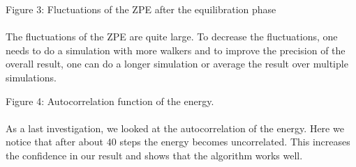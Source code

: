 \documentclass [12pt]{report}
\begin{document}
\begin{center}
\end{center}
Figure 3: Fluctuations of the ZPE after the equilibration phase\\
\\
The fluctuations of the ZPE are quite large. To decrease the fluctuations, one needs to do a simulation with more walkers and to improve the precision of the overall result, one can do a longer simulation or average the result over multiple simulations.
\begin{center}
\end{center}
Figure 4: Autocorrelation function of the energy.\\
\\
As a last investigation, we looked at the autocorrelation of the energy. Here we notice that after about $40$ steps the energy becomes uncorrelated. This increases the confidence in our result and shows that the algorithm works well.
\end{document}
